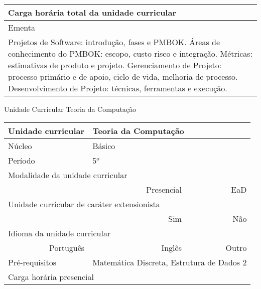 \begin{quadro}[ht!]
\begin{tabular}{|p{3cm} p{2cm} p{3cm} p{2cm} p{3cm} p{2cm}|}
\multicolumn{5}{|p{13cm}|}{\cellcolor{blue1} Carga horária total da unidade curricular} & \multicolumn{1}{p{1cm}|}{\raggedleft 60	}\\\hline
\multicolumn{6}{|p{15cm}|}{\cellcolor{blue1} Ementa} \\\hline
\hline\multicolumn{6}{|p{15cm}|}{\scriptsize Projetos de Software: introdução, fases e PMBOK. Áreas de conhecimento do PMBOK: escopo, custo risco e integração. Métricas: estimativas de produto e projeto. Gerenciamento de Projeto: processo primário e de apoio, ciclo de vida, melhoria de processo. Desenvolvimento de Projeto: técnicas, ferramentas e execução.}\\\hline
\hline
	\end{tabular}
\end{quadro}
\clearpage
\newpage\begin{quadro}[ht!]
  \centering\scriptsize
\caption{Unidade Curricular Teoria da Computação}
\label{ unit_26 }
\begin{tabular}{|p{3cm} p{2cm} p{3cm} p{2cm} p{3cm} p{2cm}|}\hline
\multicolumn{1}{|p{3cm}|}{\cellcolor{blue1} Unidade curricular} & \multicolumn{5}{p{9cm}|}{ Teoria da Computação }\\\hline
\multicolumn{1}{|p{3cm}|}{\cellcolor{blue1} Núcleo} & \multicolumn{5}{p{11.5cm}|}{ Básico }\\\hline
\multicolumn{1}{|p{3cm}|}{\cellcolor{blue1} Período} & \multicolumn{5}{p{9cm}|}{ 5$^o$ }\\\hline
\multicolumn{6}{|p{15cm}|}{\cellcolor{blue1} Modalidade da unidade curricular} \\\hline
\multicolumn{2}{|r}{		} &  \multicolumn{2}{r}{Presencial \XBox } & \multicolumn{2}{r|}{EaD \Square	} \\\hline
\multicolumn{6}{|p{15cm}|}{\cellcolor{blue1} Unidade curricular de caráter extensionista} \\\hline
\multicolumn{4}{|r}{			Sim \Square	} & \multicolumn{2}{r|}{	Não \XBox	}\\\hline
\multicolumn{6}{|p{15cm}|}{\cellcolor{blue1} Idioma da unidade curricular} \\ \hline
\multicolumn{2}{|r}{	Português \XBox	} &  \multicolumn{2}{r}{	Inglês \Square	} & \multicolumn{2}{r|}{	Outro \Square	} \\ \hline
\multicolumn{1}{|p{3cm}|}{\cellcolor{blue1} Pré-requisitos} & \multicolumn{5}{p{9cm}|}{ Matemática Discreta, Estrutura de Dados 2 }\\ \hline
\multicolumn{6}{|p{15cm}|}{\cellcolor{blue1} Carga horária presencial} \\ \hline

\end{tabular}
\end{quadro}
